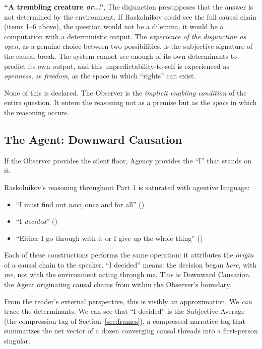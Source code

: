 \textbf{``A trembling creature \emph{or}...''},  The disjunction presupposes that the answer is not determined by the environment. If Raskolnikov could see the full causal chain (items 1--6 above), the question would not be a dilemma,  it would be a computation with a deterministic output. The \emph{experience of the disjunction as open},  as a genuine choice between two possibilities,  is the subjective signature of the causal break. The system cannot see enough of its own determinants to predict its own output, and this unpredictability-to-self is experienced as \emph{openness}, as \emph{freedom}, as the space in which ``rights'' can exist.

None of this is declared. The Observer is the \emph{implicit enabling condition} of the entire question. It enters the reasoning not as a premise but as the \emph{space} in which the reasoning occurs.



\subsection*{The Agent: Downward Causation}


If the Observer provides the silent floor, Agency provides the ``I'' that stands on it.

Raskolnikov's reasoning throughout Part 1 is saturated with agentive language:

\begin{itemize}
\item ``I must find out \emph{now},  once and for all'' (\emph{})
\item ``I \emph{decided}'' (\emph{})
\item ``Either I go through with it or I give up the whole thing'' (\emph{})
\end{itemize}


Each of these constructions performs the same operation: it attributes the \emph{origin} of a causal chain to the speaker. ``I decided'' means: the decision began \emph{here}, with \emph{me}, not with the environment acting through me. This is Downward Causation,  the Agent originating causal chains from within the Observer's boundary.

From the reader's external perspective, this is visibly an approximation. We \emph{can} trace the determinants. We can see that ``I decided'' is the Subjective Average (the compression tag of Section~\ref{sec:frames}),  a compressed narrative tag that summarizes the net vector of a dozen converging causal threads into a first-person singular.

